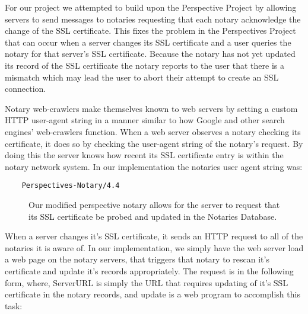 \documentclass[preprint,review,12pt]{elsarticle}
\begin{document}
For our project we attempted to build upon the Perspective Project by allowing
servers to send messages to notaries requesting that each notary acknowledge
the change of the SSL certificate. This fixes the problem in the Perspectives
Project that can occur when a server changes its SSL certificate and a user
queries the notary for that server's SSL certificate. Because the notary has
not yet updated its record of the SSL certificate the notary reports to the
user that there is a mismatch which may lead the user to abort their attempt to
create an SSL connection.

Notary web-crawlers make themselves known to web servers by setting a custom
HTTP user-agent string in a manner similar to how Google and other search
engines' web-crawlers function. When a web server observes a notary checking
its certificate, it does so by checking the user-agent string of the notary's
request.  By doing this the server knows how recent its SSL certificate entry
is within the notary network system.  In our implementation the notaries user
agent string was:

\begin{verbatim}
    Perspectives-Notary/4.4
\end{verbatim}

\begin{figure}[h]
\caption{Our modified perspective notary allows for the server to request that
    its SSL certificate be probed and updated in the Notaries Database.}
\end{figure}

When a server changes it's SSL certificate, it sends an HTTP request to all of
the notaries it is aware of. In our implementation, we simply have the web
server load a web page on the notary servers, that triggers that notary to
rescan it's certificate and update it's records appropriately. The request is
in the following form, where, ServerURL is simply the URL that requires
updating of it's SSL certificate in the notary records, and update is a web
program to accomplish this task:
\end{document}
